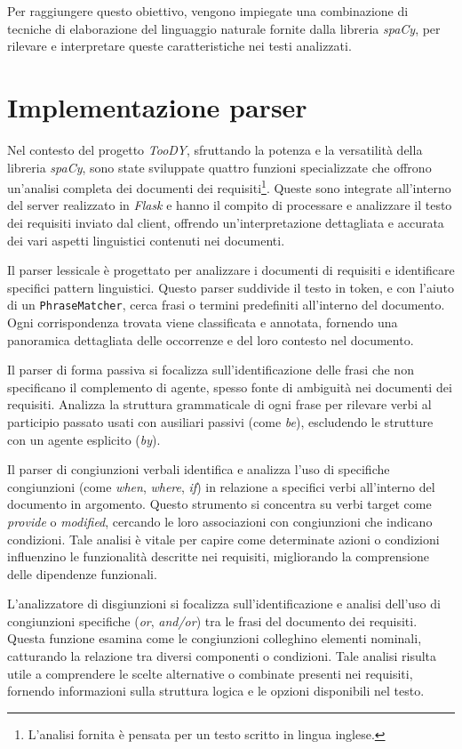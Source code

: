 \documentclass[12pt]{report}
\newcommand{\toody}{\textsl{TooDY}\xspace}
\newcommand{\flask}{\textsl{Flask}\xspace}
\newcommand{\spacy}{\textsl{spaCy}\xspace}
\begin{document}
Per raggiungere questo obiettivo, vengono impiegate una combinazione di tecniche di elaborazione del linguaggio naturale fornite dalla libreria \spacy, per rilevare e interpretare queste caratteristiche nei testi analizzati.


\section{Implementazione parser}
Nel contesto del progetto \toody, sfruttando la potenza e la versatilità della libreria \spacy, sono state sviluppate quattro funzioni specializzate che offrono un'analisi completa dei documenti dei requisiti\footnote{L'analisi fornita è pensata per un testo scritto in lingua inglese.}. Queste sono integrate all'interno del server realizzato in \flask e hanno il compito di processare e analizzare il testo dei requisiti inviato dal client, offrendo un'interpretazione dettagliata e accurata dei vari aspetti linguistici contenuti nei documenti.

Il \textsf{parser lessicale} è progettato per analizzare i documenti di requisiti e identificare specifici pattern linguistici. Questo parser suddivide il testo in token, e con l'aiuto di un \texttt{PhraseMatcher}, cerca frasi o termini predefiniti all'interno del documento. Ogni corrispondenza trovata viene classificata e annotata, fornendo una panoramica dettagliata delle occorrenze e del loro contesto nel documento.

Il \textsf{parser di forma passiva} si focalizza sull'identificazione delle frasi che non specificano il complemento di agente, spesso fonte di ambiguità nei documenti dei requisiti. Analizza la struttura grammaticale di ogni frase per rilevare verbi al participio passato usati con ausiliari passivi (come \textit{be}), escludendo le strutture con un agente esplicito (\textit{by}).

Il \textsf{parser di congiunzioni verbali} identifica e analizza l'uso di specifiche congiunzioni (come \textit{when}, \textit{where}, \textit{if}) in relazione a specifici verbi all'interno del documento in argomento. Questo strumento si concentra su verbi target come \textit{provide} o \textit{modified}, cercando le loro associazioni con congiunzioni che indicano condizioni. Tale analisi è vitale per capire come determinate azioni o condizioni influenzino le funzionalità descritte nei requisiti, migliorando la comprensione delle dipendenze funzionali.

L'\textsf{analizzatore di disgiunzioni} si focalizza sull'identificazione e analisi dell'uso di congiunzioni specifiche (\textit{or}, \textit{and/or}) tra le frasi del documento dei requisiti. Questa funzione esamina come le congiunzioni colleghino elementi nominali, catturando la relazione tra diversi componenti o condizioni. Tale analisi risulta utile a comprendere le scelte alternative o combinate presenti nei requisiti, fornendo informazioni sulla struttura logica e le opzioni disponibili nel testo.
\end{document}
